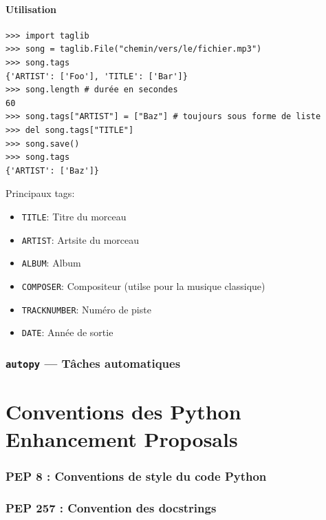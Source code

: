 \documentclass[a4paper, 10pt]{article}
\begin{document}
\subsection{Utilisation}
\begin{verbatim}
>>> import taglib
>>> song = taglib.File("chemin/vers/le/fichier.mp3")
>>> song.tags
{'ARTIST': ['Foo'], 'TITLE': ['Bar']}
>>> song.length # durée en secondes
60
>>> song.tags["ARTIST"] = ["Baz"] # toujours sous forme de liste
>>> del song.tags["TITLE"]
>>> song.save()
>>> song.tags
{'ARTIST': ['Baz']}
\end{verbatim}

Principaux tags:
\begin{itemize}
    \item \texttt{TITLE}: Titre du morceau
    \item \texttt{ARTIST}: Artsite du morceau
    \item \texttt{ALBUM}: Album
    \item \texttt{COMPOSER}: Compositeur (utilse pour la musique classique)
    \item \texttt{TRACKNUMBER}: Numéro de piste
    \item \texttt{DATE}: Année de sortie
\end{itemize}

\section[{\footnotesize\texttt{autopy}} --- Tâches automatiques]{{\normalfont\large\bfseries\texttt{autopy}} --- Tâches automatiques}

\part{Conventions des Python Enhancement Proposals}
\section{PEP 8 : Conventions de style du code Python}
\section{PEP 257 : Convention des docstrings}


\printindex
\end{document}

